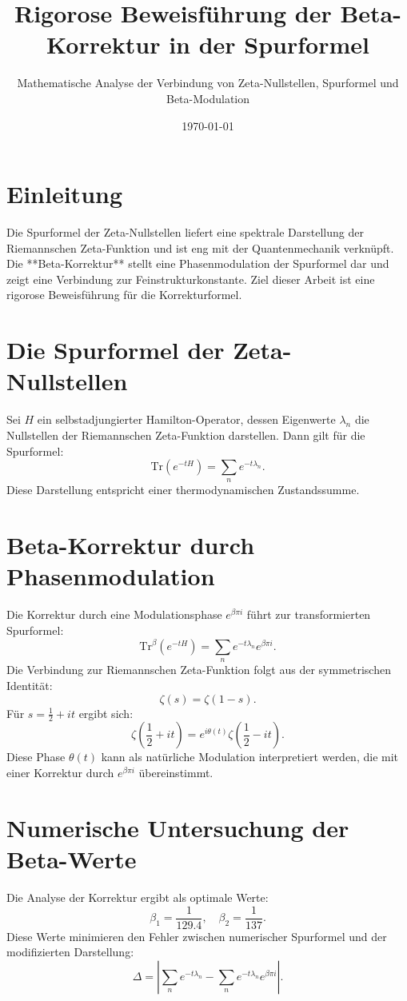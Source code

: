 \documentclass[a4paper,12pt]{article}
\title{Rigorose Beweisführung der Beta-Korrektur in der Spurformel}
\author{Mathematische Analyse der Verbindung von Zeta-Nullstellen, Spurformel und Beta-Modulation}
\date{\today}
\begin{document}
\maketitle

\section{Einleitung}
Die Spurformel der Zeta-Nullstellen liefert eine spektrale Darstellung der Riemannschen Zeta-Funktion und ist eng mit der Quantenmechanik verknüpft. Die **Beta-Korrektur** stellt eine Phasenmodulation der Spurformel dar und zeigt eine Verbindung zur Feinstrukturkonstante. Ziel dieser Arbeit ist eine rigorose Beweisführung für die Korrekturformel.

\section{Die Spurformel der Zeta-Nullstellen}
Sei $H$ ein selbstadjungierter Hamilton-Operator, dessen Eigenwerte $\lambda_n$ die Nullstellen der Riemannschen Zeta-Funktion darstellen. Dann gilt für die Spurformel:
\begin{equation}
\text{Tr}(e^{-tH}) = \sum_{n} e^{-t\lambda_n}.
\end{equation}
Diese Darstellung entspricht einer thermodynamischen Zustandssumme.

\section{Beta-Korrektur durch Phasenmodulation}
Die Korrektur durch eine Modulationsphase $e^{\beta \pi i}$ führt zur transformierten Spurformel:
\begin{equation}
\text{Tr}^\beta(e^{-tH}) = \sum_{n} e^{-t\lambda_n} e^{\beta \pi i}.
\end{equation}
Die Verbindung zur Riemannschen Zeta-Funktion folgt aus der symmetrischen Identität:
\begin{equation}
\zeta(s) = \zeta(1-s).
\end{equation}
Für $s = \frac{1}{2} + it$ ergibt sich:
\begin{equation}
\zeta\left(\frac{1}{2} + it\right) = e^{i\theta(t)} \zeta\left(\frac{1}{2} - it\right).
\end{equation}
Diese Phase $\theta(t)$ kann als natürliche Modulation interpretiert werden, die mit einer Korrektur durch $e^{\beta \pi i}$ übereinstimmt.

\section{Numerische Untersuchung der Beta-Werte}
Die Analyse der Korrektur ergibt als optimale Werte:
\begin{equation}
\beta_1 = \frac{1}{129.4}, \quad \beta_2 = \frac{1}{137}.
\end{equation}
Diese Werte minimieren den Fehler zwischen numerischer Spurformel und der modifizierten Darstellung:
\begin{equation}
\Delta = \left| \sum_{n} e^{-t\lambda_n} - \sum_{n} e^{-t\lambda_n} e^{\beta \pi i} \right|.
\end{equation}
\end{document}
